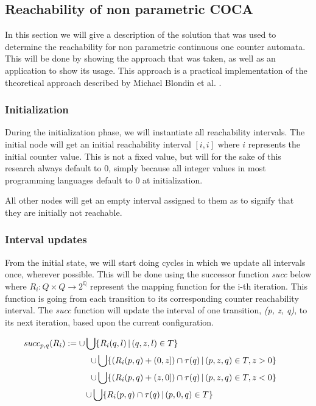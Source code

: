 \documentclass[12pt]{article}
\begin{document}
\subsection{Reachability of non parametric COCA}
In this section we will give a description of the solution that was used to determine the reachability for non parametric continuous one counter automata. This will be done by showing the approach that was taken, as well as an application to show its usage. This approach is a practical implementation of the theoretical approach described by Michael Blondin et al. \cite{blondin2021continuous}.

\subsubsection{Initialization}
During the initialization phase, we will instantiate all reachability intervals. The initial node will get an initial reachability interval $[i, i]$ where $i$ represents the initial counter value. This is not a fixed value, but will for the sake of this research always default to 0, simply because all integer values in most programming languages default to 0 at initialization.

All other nodes will get an empty interval assigned to them as to signify that they are initially not reachable.

\subsubsection{Interval updates}
\label{interval updates}
From the initial state, we will start doing cycles in which we update all intervals once, wherever possible. This will be done using the successor function \textit{succ} below where $R_i: Q \times Q \rightarrow 2^\mathbb{Q}$ represent the mapping function for the i-th iteration. This function is going from each transition to its corresponding counter reachability interval. The \textit{succ} function will update the interval of one transition, \textit{(p, z, q)}, to its next iteration, based upon the current configuration.

\begin{gather*}
	\hspace{-134 pt} succ_{p, q}(R_i) := \cup \bigcup \{R_i(q, l)\,|\,(q,z,l) \in T\}\\
	\hspace{60 pt} \cup \bigcup \{(R_i(p, q) + (0, z]) \cap \tau(q)\,|\,(p,z,q) \in T, z>0\}\\
	\hspace{60 pt} \cup \bigcup \{(R_i(p, q) + (z, 0]) \cap \tau(q)\,|\,(p,z,q) \in T, z<0\}\\
	\hspace{-20 pt} \cup \bigcup \{R_i(p, q) \cap \tau(q)\,|\,(p,0,q) \in T\}
\end{gather*}
\end{document}
